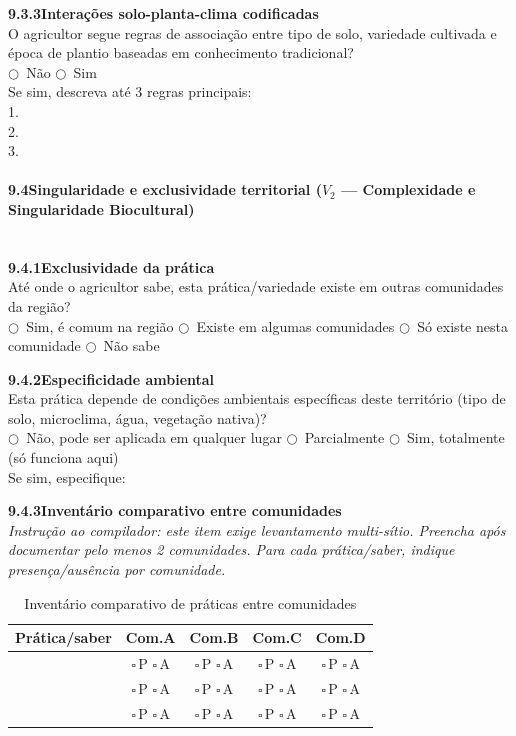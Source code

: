 \medskip\noindent\textbf{9.3.3\quad Interações solo-planta-clima codificadas}\\[2pt]
O agricultor segue regras de associação entre tipo de solo, variedade cultivada e época de plantio baseadas em conhecimento tradicional?\\
$\bigcirc$~Não \quad $\bigcirc$~Sim\\[2pt]
Se sim, descreva até 3 regras principais:\\
1.\@ \dotfill\\
2.\@ \dotfill\\
3.\@ \dotfill

\paragraph{9.4\quad Singularidade e exclusividade territorial ($V_2$ --- Complexidade e Singularidade Biocultural)}~\\[4pt]

\noindent\textbf{9.4.1\quad Exclusividade da prática}\\[2pt]
Até onde o agricultor sabe, esta prática/variedade existe em outras comunidades da região?\\
$\bigcirc$~Sim, é comum na região \quad $\bigcirc$~Existe em algumas comunidades \quad $\bigcirc$~Só existe nesta comunidade \quad $\bigcirc$~Não sabe

\medskip\noindent\textbf{9.4.2\quad Especificidade ambiental}\\[2pt]
Esta prática depende de condições ambientais específicas deste território (tipo de solo, microclima, água, vegetação nativa)?\\
$\bigcirc$~Não, pode ser aplicada em qualquer lugar \quad $\bigcirc$~Parcialmente \quad $\bigcirc$~Sim, totalmente (só funciona aqui)\\[2pt]
Se sim, especifique: \dotfill

\medskip\noindent\textbf{9.4.3\quad Inventário comparativo entre comunidades}\\[2pt]
\textit{Instrução ao compilador: este item exige levantamento multi-sítio. Preencha após documentar pelo menos 2 comunidades. Para cada prática/saber, indique presença/ausência por comunidade.}

\begin{table}[htbp]
\centering\small
\caption{Inventário comparativo de práticas entre comunidades}
\label{tab:app_beta_div}
\begin{tabular}{p{3.5cm}cccc}
\toprule
\textbf{Prática/saber} & \textbf{Com.\@ A} & \textbf{Com.\@ B} & \textbf{Com.\@ C} & \textbf{Com.\@ D} \\
\midrule
& $\square$\,P $\square$\,A & $\square$\,P $\square$\,A & $\square$\,P $\square$\,A & $\square$\,P $\square$\,A \\
& $\square$\,P $\square$\,A & $\square$\,P $\square$\,A & $\square$\,P $\square$\,A & $\square$\,P $\square$\,A \\
& $\square$\,P $\square$\,A & $\square$\,P $\square$\,A & $\square$\,P $\square$\,A & $\square$\,P $\square$\,A \\
\bottomrule
\end{tabular}
\end{table}

